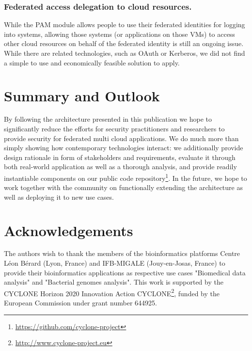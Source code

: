 \documentclass{llncs}
\begin{document}
\subsubsection{Federated access delegation to cloud resources.} 
While the PAM module allows people to use their federated identities for logging into systems, allowing those systems (or applications on those VMs) to access other cloud resources on behalf of the federated identity is still an ongoing issue. While there are related technologies, such as OAuth or Kerberos, we did not find a simple to use and economically feasible solution to apply.

\section{Summary and Outlook}
\label{sec:summary}

By following the architecture presented in this publication we hope to significantly reduce the efforts for security practitioners and researchers to provide security for federated multi cloud applications. We do much more than simply showing how contemporary technologies interact: we additionally provide design rationale in form of stakeholders and requirements, evaluate it through both real-world application as well as a thorough analysis, and provide readily instantiable components on our public code repository\footnote{\url{https://github.com/cyclone-project}}. In the future, we hope to work together with the community on functionally extending the architecture as well as deploying it to new use cases.

\section*{Acknowledgements}

The authors wish to thank the members of the bioinformatics platforms Centre Léon Bérard (Lyon, France) and IFB-MIGALE (Jouy-en-Josas, France) to provide their bioinformatics applications as respective use cases "Biomedical data analysis" and "Bacterial genomes analysis". This work is supported by the CYCLONE Horizon 2020 Innovation Action
CYCLONE\footnote{\url{http://www.cyclone-project.eu}}, funded by the European Commission under grant number 644925.



\end{document}
